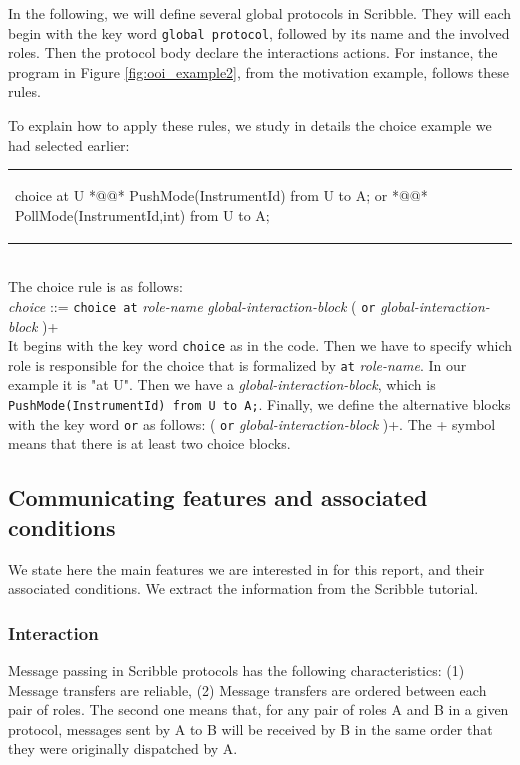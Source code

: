 \documentclass[a4paper,11pt,twoside]{report}
\begin{document}
In the following, we will define several global protocols in Scribble. They will each begin with the key word \texttt{global protocol}, followed by its name and the involved roles. Then the protocol body declare the interactions actions. For instance, the program in Figure \ref{fig:ooi_example2}, from the motivation example, follows these rules.

To explain how to apply these rules, we study in details the choice example we had selected earlier:\\
\begin{tabular}{ll}
\begin{SJLISTING}
choice at U { *@\label{line:userchoiceopen}@*
	PushMode(InstrumentId) from U to A;
} or { *@\label{line:userchoiceor}@*
	PollMode(InstrumentId,int) from U to A;
}
\end{SJLISTING}
& \\
\end{tabular}\\
The choice rule is as follows:\\
\textit{choice} ::= \texttt{choice at} \textit{role-name}  \textit{global-interaction-block}  ( \texttt{or}  \textit{global-interaction-block}  )+\\
It begins with the key word \texttt{choice} as in the code. Then we have to specify which role is responsible for the choice that is formalized by \texttt{at} \textit{role-name}. In our example it is "at U". Then we have a \textit{global-interaction-block}, which is \texttt{PushMode(InstrumentId) from U to A;}. Finally, we define the alternative blocks with the key word \texttt{or} as follows: ( \texttt{or}  \textit{global-interaction-block}  )+. The + symbol means that there is at least two choice blocks.



\subsection{Communicating features and associated conditions}
We state here the main features we are interested in for this report, and their associated conditions. We extract the information from the Scribble tutorial.

\subsubsection{Interaction}
Message passing in Scribble protocols has the following characteristics: (1) Message transfers are reliable, (2) Message transfers are ordered between each pair of roles. The second one means that, for any pair of roles A and B in a given protocol, messages sent by A to B will be received by B in the same order that they were originally dispatched by A. 
\end{document}
